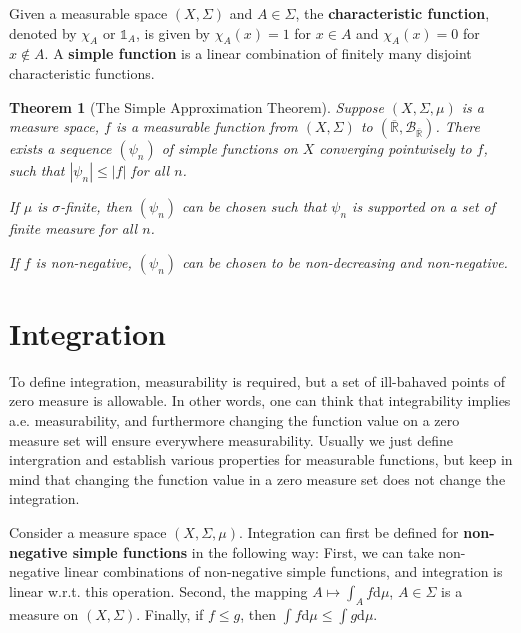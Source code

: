\documentclass[openany]{book}
\newtheorem{theorem}{Theorem}[chapter]
\theoremstyle{definition}
\theoremstyle{remark}
\begin{document}
Given a measurable space $(X,\Sigma)$ and $A\in\Sigma$, the \textbf{characteristic function}, denoted by $\chi_A$ or $\mathds{1}_A$, is given by $\chi_A(x)=1$ for $x\in A$ and $\chi_A(x)=0$ for $x\not\in A$. A \textbf{simple function} is a linear combination of finitely many disjoint characteristic functions.
\begin{theorem}[The Simple Approximation Theorem]
    Suppose $(X,\Sigma,\mu)$ is a measure space, $f$ is a measurable function from $(X,\Sigma)$ to $(\overline{\mathbb{R}},\mathcal{B}_{\overline{\mathbb{R}}})$. There exists a sequence $(\psi_n)$ of simple functions on $X$ converging pointwisely to $f$, such that $|\psi_n|\le|f|$ for all $n$.

    If $\mu$ is $\sigma$-finite, then $(\psi_n)$ can be chosen such that $\psi_n$ is supported on a set of finite measure for all $n$.

    If $f$ is non-negative, $(\psi_n)$ can be chosen to be non-decreasing and non-negative.
\end{theorem}

\section{Integration}
To define integration, measurability is required, but a set of ill-bahaved points of zero measure is allowable. In other words, one can think that integrability implies a.e. measurability, and furthermore changing the function value on a zero measure set will ensure everywhere measurability. Usually we just define intergration and establish various properties for measurable functions, but keep in mind that changing the function value in a zero measure set does not change the integration.

Consider a measure space $(X,\Sigma,\mu)$. Integration can first be defined for \textbf{non-negative simple functions} in the following way: First, we can take non-negative linear combinations of non-negative simple functions, and integration is linear w.r.t. this operation. Second, the mapping $A\mapsto\int_Af \mathrm{d}\mu$, $A\in\Sigma$ is a measure on $(X,\Sigma)$. Finally, if $f\le g$, then $\int f \mathrm{d}\mu\le\int g \mathrm{d}\mu$.
\end{document}
